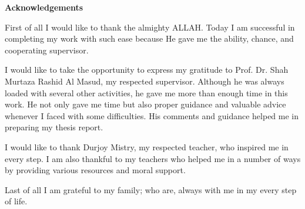 \newpage
\thispagestyle{plain}
    \begin{center}
    
        \vspace*{0.1cm}
        \Large
        \textbf{Acknowledgements}\\
        \vspace{0.5cm}
        
    \end{center}

\textbf{}

First of all I would like to thank the almighty ALLAH. Today I am successful in completing my work with such ease because He gave me the ability, chance, and cooperating supervisor.

I would like to take the opportunity to express my gratitude to Prof. Dr. Shah Murtaza Rashid Al Masud, my respected supervisor. Although he was always loaded with several other activities, he gave me more than enough time in this work. He not only gave me time but also proper guidance and valuable advice whenever I faced with some difficulties. His comments and guidance helped me in preparing my thesis report.

I would like to thank Durjoy Mistry, my respected teacher, who inspired me in every step. I am also thankful to my teachers who helped me in a number of ways by providing various resources and moral support.

Last of all I am grateful to my family; who are, always with me in my every step of life.